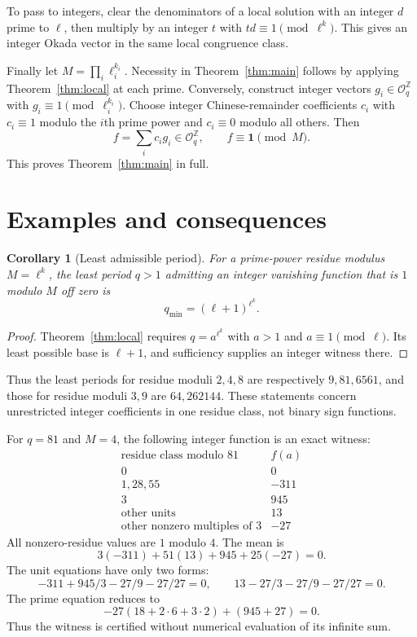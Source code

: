 \documentclass[11pt]{article}
\newtheorem{corollary}[theorem]{Corollary}
\newcommand{\Z}{\mathbb Z}
\newcommand{\OO}{\mathcal O}
\begin{document}
To pass to integers, clear the denominators of a local solution with an integer $d$ prime to $\ell$, then multiply by an integer $t$ with $td\equiv1\pmod{\ell^k}$. This gives an integer Okada vector in the same local congruence class.

Finally let $M=\prod_i\ell_i^{k_i}$. Necessity in Theorem~\ref{thm:main} follows by applying Theorem~\ref{thm:local} at each prime. Conversely, construct integer vectors $g_i\in\OO_q^{\Z}$ with $g_i\equiv1\pmod{\ell_i^{k_i}}$. Choose integer Chinese-remainder coefficients $c_i$ with $c_i\equiv1$ modulo the $i$th prime power and $c_i\equiv0$ modulo all others. Then
\[
 f=\sum_i c_i g_i\in\OO_q^{\Z},\qquad f\equiv\boldsymbol1\pmod M.
\]
This proves Theorem~\ref{thm:main} in full.

\section{Examples and consequences}
\begin{corollary}[Least admissible period]
For a prime-power residue modulus $M=\ell^k$, the least period $q>1$ admitting an integer vanishing function that is $1$ modulo $M$ off zero is
\[
 q_{\min}=(\ell+1)^{\ell^k}.
\]
\end{corollary}
\begin{proof}
Theorem~\ref{thm:local} requires $q=a^{\ell^k}$ with $a>1$ and $a\equiv1\pmod\ell$. Its least possible base is $\ell+1$, and sufficiency supplies an integer witness there.
\end{proof}
Thus the least periods for residue moduli $2,4,8$ are respectively $9,81,6561$, and those for residue moduli $3,9$ are $64,262144$. These statements concern unrestricted integer coefficients in one residue class, not binary sign functions.

For $q=81$ and $M=4$, the following integer function is an exact witness:
\[
\begin{array}{c|r}
\text{residue class modulo }81& f(a)\\\hline
0&0\\
1,28,55&-311\\
3&945\\
\text{other units}&13\\
\text{other nonzero multiples of }3&-27
\end{array}
\]
All nonzero-residue values are $1$ modulo $4$. The mean is
\[
 3(-311)+51(13)+945+25(-27)=0.
\]
The unit equations have only two forms:
\[
 -311+945/3-27/9-27/27=0,
 \qquad 13-27/3-27/9-27/27=0.
\]
The prime equation reduces to
\[
 -27(18+2\cdot6+3\cdot2)+(945+27)=0.
\]
Thus the witness is certified without numerical evaluation of its infinite sum.
\end{document}
